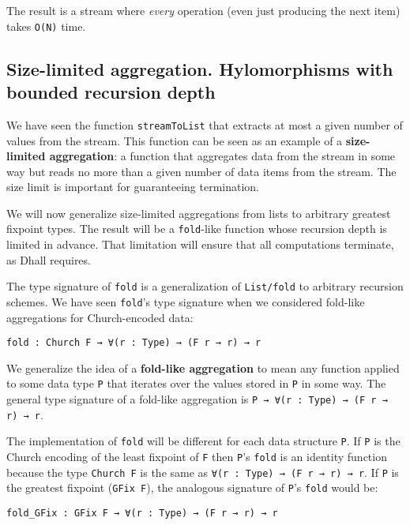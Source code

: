 The result is a stream where \emph{every} operation (even just producing the next item) takes \lstinline!O(N)! time.


\subsection{Size-limited aggregation. Hylomorphisms with bounded recursion depth}


We have seen the function \lstinline!streamToList! that extracts at most a given number of values from the stream.
This function can be seen as an example of a \textbf{size-limited aggregation}: a function that aggregates data from the stream in some way but reads no more than a given number of data items from the stream.
The size limit is important for guaranteeing termination.


We will now generalize size-limited aggregations from lists to arbitrary greatest fixpoint types.
The result will be a \lstinline!fold!-like function whose recursion depth is limited in advance.
That limitation will ensure that all computations terminate, as Dhall requires.


The type signature of \lstinline!fold! is a generalization of \lstinline!List/fold! to arbitrary recursion schemes.
We have seen \lstinline!fold!'s type signature when we considered fold-like aggregations for Church-encoded data:


\begin{lstlisting}[language=Dhall]
fold : Church F → ∀(r : Type) → (F r → r) → r
\end{lstlisting}


We generalize the idea of a \textbf{fold-like aggregation} to mean any function applied to some data type \lstinline!P! that iterates over the values stored in \lstinline!P! in some way.
The general type signature of a fold-like aggregation is \lstinline!P → ∀(r : Type) → (F r → r) → r!.


The implementation of \lstinline!fold! will be different for each data structure \lstinline!P!.
If \lstinline!P! is the Church encoding of the least fixpoint of \lstinline!F! then \lstinline!P!'s \lstinline!fold! is an identity function because the type \lstinline!Church F! is the same as \lstinline!∀(r : Type) → (F r → r) → r!.
If \lstinline!P! is the greatest fixpoint (\lstinline!GFix F!), the analogous signature of \lstinline!P!'s \lstinline!fold! would be:


\begin{lstlisting}[language=Dhall]
fold_GFix : GFix F → ∀(r : Type) → (F r → r) → r
\end{lstlisting}


